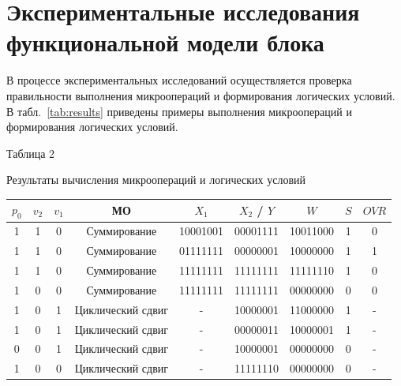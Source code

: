 \documentclass[oneside,a4paper,14pt]{extarticle}
\begin{document}
\section*{Экспериментальные исследования функциональной модели блока}

В процессе экспериментальных исследований осуществляется проверка правильности выполнения микроопераций и формирования логических условий. В табл.~\ref{tab:results} приведены примеры выполнения микроопераций и формирования логических условий.
\begin{flushright}
	Таблица 2
\end{flushright}
\begin{center}
	Результаты вычисления микроопераций и логических условий
\end{center}

\begin{small}
	\begin{tabular}{|c|c|c|c|c|c|c|c|c|}
		\hline
		$p_0$ & $v_2$ & $v_1$ & МО                & $X_1$    & $X_2$ / $Y$ & $W$      & $S$ & $OVR$ \\
		\hline
		1     & 1     & 0     & Суммирование      & 10001001 & 00001111    & 10011000 & 1   & 0     \\
		\hline
		1     & 1     & 0     & Суммирование      & 01111111 & 00000001    & 10000000 & 1   & 1     \\
		\hline
		1     & 1     & 0     & Суммирование      & 11111111 & 11111111    & 11111110 & 1   & 0     \\
		\hline
		1     & 0     & 0     & Суммирование      & 11111111 & 11111111    & 00000000 & 0   & 0     \\

		\hline
		1     & 0     & 1     & Циклический сдвиг & -        & 10000001    & 11000000 & 1   & -     \\
		\hline
		1     & 0     & 1     & Циклический сдвиг & -        & 00000011    & 10000001 & 1   & -     \\
		\hline
		0     & 0     & 1     & Циклический сдвиг & -        & 10000001    & 00000000 & 0   & -     \\
		\hline
		1     & 0     & 0     & Циклический сдвиг & -        & 11111110    & 00000000 & 0   & -     \\

		\hline
	\end{tabular}
\end{small}\\
\end{document}
